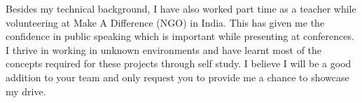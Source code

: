 \documentclass[11pt,a4paper,roman]{moderncv} %
\begin{document}











Besides my technical background, I have also worked part time as a teacher while volunteering at Make A Difference (NGO) in India. 
This has given me the confidence in public speaking which is important while presenting at conferences.
I thrive in working in unknown environments and have learnt most of the 
concepts required for these projects through self study. I believe I will be 
a good addition to your team and only request you to provide me a 
chance to showcase my drive.%

\vspace{20pt}
\makeletterclosing %


\newpage

%
\end{document}

